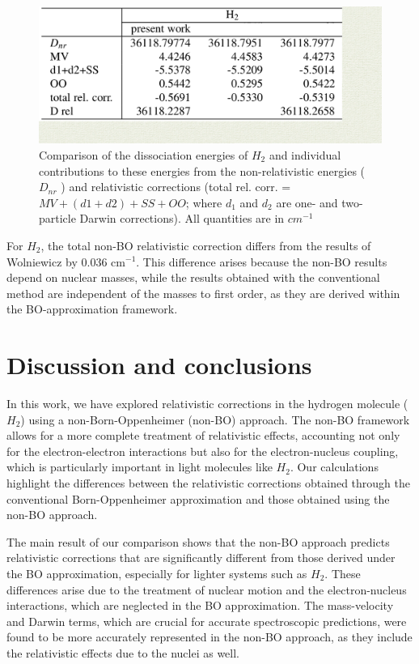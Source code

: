 \documentclass[%
 reprint,
 amsmath,amssymb,
 aps,
]{revtex4-2}
\begin{document}
\begin{figure}[H]
    \centering
    \includegraphics[scale=0.2]{Tabla1CRM.png}
    \caption{Comparison of the dissociation energies of $H_2$ and individual contributions to these energies from the non-relativistic energies ($D_{nr}$ ) and relativistic corrections (total rel. corr. = $MV + (d1+d2) + SS + OO$; where $d_1$ and $d_2$ are one- and two-particle Darwin corrections). All quantities are in $cm^{-1}$}
    \label{fig:enter-label}
\end{figure}

For \( H_2 \), the total non-BO relativistic correction differs from the results of Wolniewicz \cite{wolniewicz1995nonadiabatic} by 0.036 cm\(^{-1}\). This difference arises because the non-BO results depend on nuclear masses, while the results obtained with the conventional method are independent of the masses to first order, as they are derived within the BO-approximation framework.

\section{Discussion and conclusions}

In this work, we have explored relativistic corrections in the hydrogen molecule (\(H_2\)) using a non-Born-Oppenheimer (non-BO) approach. The non-BO framework allows for a more complete treatment of relativistic effects, accounting not only for the electron-electron interactions but also for the electron-nucleus coupling, which is particularly important in light molecules like \(H_2\). Our calculations highlight the differences between the relativistic corrections obtained through the conventional Born-Oppenheimer approximation and those obtained using the non-BO approach.

The main result of our comparison shows that the non-BO approach predicts relativistic corrections that are significantly different from those derived under the BO approximation, especially for lighter systems such as \(H_2\). These differences arise due to the treatment of nuclear motion and the electron-nucleus interactions, which are neglected in the BO approximation. The mass-velocity and Darwin terms, which are crucial for accurate spectroscopic predictions, were found to be more accurately represented in the non-BO approach, as they include the relativistic effects due to the nuclei as well.
\end{document}
